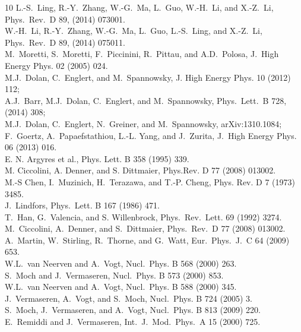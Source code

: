 \begin{thebibliography}{10}
L.-S.~Ling, R.-Y.~Zhang, W.-G.~Ma, L.~Guo, W.-H.~Li, and X.-Z.~Li, Phys.~Rev.~D 89, (2014) 073001.
\\
W.-H.~Li, R.-Y.~Zhang, W.-G.~Ma, L.~Guo, L.-S.~Ling, and X.-Z.~Li, Phys.~Rev.~D 89, (2014) 075011.
\\
M.~Moretti, S.~Moretti, F.~Piccinini, R.~Pittau, and A.D.~Polosa,
J.~High Energy Phys. 02 (2005) 024.
\\
M.J.~Dolan, C.~Englert, and M.~Spannowsky, J. High Energy Phys. 10 (2012) 112;\\
A.J.~Barr, M.J.~Dolan, C.~Englert, and M.~Spannowsky, Phys.~Lett.~B 728, (2014) 308;\\
M.J.~Dolan, C.~Englert, N.~Greiner, and M.~Spannowsky, arXiv:1310.1084;\\
F.~Goertz, A.~Papaefstathiou, L.-L. Yang, and J.~Zurita,
J.~High Energy Phys. 06 (2013) 016.
\\
E. N. Argyres et al., Phys. Lett. B 358 (1995) 339.
\\
M. Ciccolini, A. Denner, and S. Dittmaier, Phys.Rev. D 77 (2008) 013002. 
\\
M.-S Chen, I.~Muzinich, H.~Terazawa, and T.-P. Cheng, Phys. Rev. D 7 (1973) 3485. 
\\
J.~Lindfors, Phys.~Lett. B 167 (1986) 471.
\\
T.~Han, G.~Valencia, and S. Willenbrock, Phys.~Rev.~Lett. 69 (1992) 3274.
\\
M.~Ciccolini, A.~Denner, and S.~Dittmaier, Phys.~Rev.~D 77 (2008) 013002.
\\
A.~Martin, W.~Stirling, R.~Thorne, and G.~Watt, Eur.~Phys.~J.~C 64 (2009) 653.
\\
W.L.~van Neerven and A.~Vogt, Nucl.~Phys. B 568 (2000) 263.
\\
S.~Moch and J.~Vermaseren, Nucl.~Phys. B 573 (2000) 853.
\\
W.L.~van Neerven and A.~Vogt, Nucl.~Phys. B 588 (2000) 345.
\\
J.~Vermaseren, A.~Vogt, and S.~Moch, Nucl.~Phys. B 724 (2005) 3.
\\
S.~Moch, J.~Vermaseren, and A.~Vogt, Nucl.~Phys. B 813 (2009) 220.
\\
E.~Remiddi and J.~Vermaseren, Int.~J.~Mod.~Phys.~A 15 (2000) 725.

\end{thebibliography}
